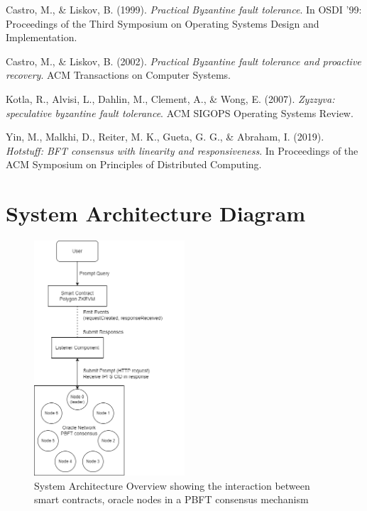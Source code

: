 \documentclass[12pt]{article}
\begin{document}
\begin{thebibliography}{9}

    Castro, M., \& Liskov, B. (1999).
    \textit{Practical Byzantine fault tolerance}.
    In OSDI '99: Proceedings of the Third Symposium on Operating Systems Design and Implementation.

    Castro, M., \& Liskov, B. (2002).
    \textit{Practical Byzantine fault tolerance and proactive recovery}.
    ACM Transactions on Computer Systems.

    Kotla, R., Alvisi, L., Dahlin, M., Clement, A., \& Wong, E. (2007).
    \textit{Zyzzyva: speculative byzantine fault tolerance}.
    ACM SIGOPS Operating Systems Review.

    Yin, M., Malkhi, D., Reiter, M. K., Gueta, G. G., \& Abraham, I. (2019).
    \textit{Hotstuff: BFT consensus with linearity and responsiveness}.
    In Proceedings of the ACM Symposium on Principles of Distributed Computing.

\end{thebibliography}

\clearpage
\appendix
\section{System Architecture Diagram}\label{appendix:arch}
\begin{figure}[H]
\centering
\includegraphics[width=0.5\textwidth]{oracle_network.png}
\caption{System Architecture Overview showing the interaction between smart contracts, oracle nodes in a PBFT consensus mechanism}
\label{fig:system-architecture}
\end{figure}
\end{document}
